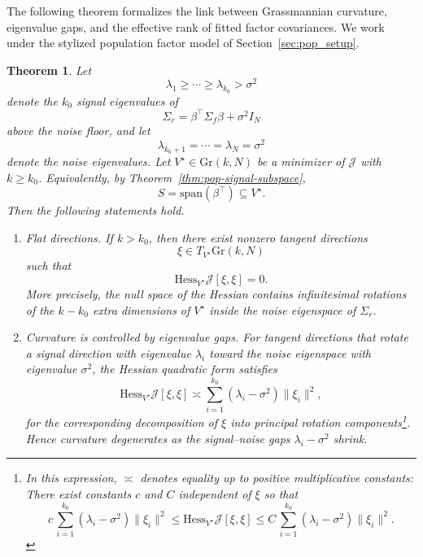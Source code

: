 \documentclass[11pt,letterpaper]{article}
\newcommand{\gr}{\mathrm{Gr}}
\newcommand{\cJ}{\mathcal{J}}
\newtheorem{theorem}{Theorem}[section]
\begin{document}
The following theorem formalizes the link between Grassmannian curvature, eigenvalue gaps, and the effective rank of fitted factor covariances. We work under the stylized population factor model of Section~\ref{sec:pop_setup}. 

\begin{theorem}
\label{thm:curv-erank}
Let
\begin{equation*}
\lambda_1\geq\cdots\geq \lambda_{k_0}>\sigma^2
\end{equation*}
denote the $k_0$ signal eigenvalues of
\begin{equation*}
\Sigma_r = \beta^\top\Sigma_f\beta+\sigma^2 I_N
\end{equation*}
above the noise floor, and let
\begin{equation*}
\lambda_{k_0+1} = \cdots = \lambda_N = \sigma^2
\end{equation*}
denote the noise eigenvalues. Let $V^\star\in\gr(k,N)$ be a minimizer of $\cJ$ with $k\geq k_0$. Equivalently, by Theorem~\ref{thm:pop-signal-subspace},
\begin{equation*}
S=\mathrm{span}(\beta^\top)\subseteq V^\star.
\end{equation*}
Then the following statements hold.

\begin{enumerate}[label=(\roman*)]
\item \emph{Flat directions.}
If $k>k_0$, then there exist nonzero tangent directions
\begin{equation*}
\xi\in T_{V^\star}\gr(k,N)
\end{equation*}
such that
\begin{equation}
\label{eq:hessian-flat-directions}
\mathrm{Hess}_{V^\star}\cJ[\xi,\xi]=0.
\end{equation}
More precisely, the null space of the Hessian contains infinitesimal rotations of the $k-k_0$ extra dimensions of $V^\star$ inside the noise eigenspace of $\Sigma_r$.

\item \emph{Curvature is controlled by eigenvalue gaps.}
For tangent directions that rotate a signal direction with eigenvalue $\lambda_i$ toward the noise eigenspace with eigenvalue $\sigma^2$, the Hessian quadratic form satisfies
\begin{equation}
\label{eq:hess-gap}
\mathrm{Hess}_{V^\star}\cJ[\xi,\xi] \asymp \sum_{i=1}^{k_0} (\lambda_i-\sigma^2)\|\xi_i\|^2,
\end{equation}
for the corresponding decomposition of $\xi$ into principal rotation components\footnote{In this expression, \(\asymp\) denotes equality up to positive multiplicative
constants: There exist constants $c$ and $C$ independent of $\xi$ so that
\begin{equation*}
c\,\sum_{i=1}^{k_0}(\lambda_i-\sigma^2)\|\xi_i\|^2 \leq \mathrm{Hess}_{V^\star}\cJ[\xi,\xi]\leq C\,\sum_{i=1}^{k_0}(\lambda_i-\sigma^2)\|\xi_i\|^2.
\end{equation*}
}. Hence curvature degenerates as the signal--noise gaps $\lambda_i-\sigma^2$ shrink. 


\end{enumerate}
\end{theorem}
\end{document}
